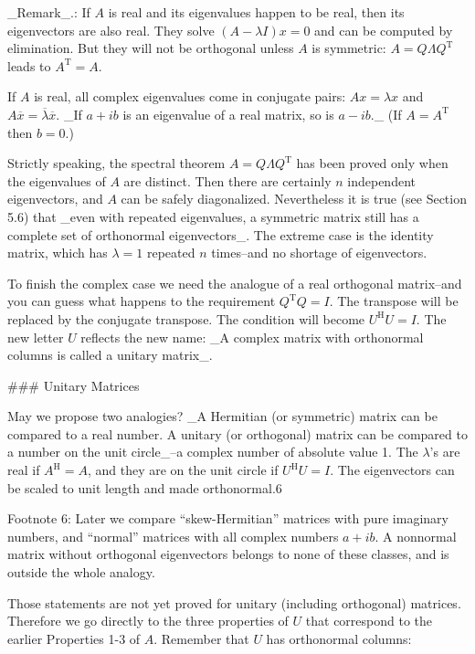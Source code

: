 _Remark_.: If \(A\) is real and its eigenvalues happen to be real, then its eigenvectors are also real. They solve \((A-\lambda I)x=0\) and can be computed by elimination. But they will not be orthogonal unless \(A\) is symmetric: \(A=Q\Lambda Q^{\mathrm{T}}\) leads to \(A^{\mathrm{T}}=A\).

If \(A\) is real, all complex eigenvalues come in conjugate pairs: \(Ax=\lambda x\) and \(A\overline{x}=\overline{\lambda}\overline{x}\). _If \(a+ib\) is an eigenvalue of a real matrix, so is \(a-ib\)._ (If \(A=A^{\mathrm{T}}\) then \(b=0\).)

Strictly speaking, the spectral theorem \(A=Q\Lambda Q^{\mathrm{T}}\) has been proved only when the eigenvalues of \(A\) are distinct. Then there are certainly \(n\) independent eigenvectors, and \(A\) can be safely diagonalized. Nevertheless it is true (see Section 5.6) that _even with repeated eigenvalues, a symmetric matrix still has a complete set of orthonormal eigenvectors_. The extreme case is the identity matrix, which has \(\lambda=1\) repeated \(n\) times--and no shortage of eigenvectors.

To finish the complex case we need the analogue of a real orthogonal matrix--and you can guess what happens to the requirement \(Q^{\mathrm{T}}Q=I\). The transpose will be replaced by the conjugate transpose. The condition will become \(U^{\mathrm{H}}U=I\). The new letter \(U\) reflects the new name: _A complex matrix with orthonormal columns is called a unitary matrix_.

### Unitary Matrices

May we propose two analogies? _A Hermitian (or symmetric) matrix can be compared to a real number. A unitary (or orthogonal) matrix can be compared to a number on the unit circle_--a complex number of absolute value 1. The \(\lambda\)'s are real if \(A^{\mathrm{H}}=A\), and they are on the unit circle if \(U^{\mathrm{H}}U=I\). The eigenvectors can be scaled to unit length and made orthonormal.6

Footnote 6: Later we compare “skew-Hermitian” matrices with pure imaginary numbers, and “normal” matrices with all complex numbers \(a+ib\). A nonnormal matrix without orthogonal eigenvectors belongs to none of these classes, and is outside the whole analogy.

Those statements are not yet proved for unitary (including orthogonal) matrices. Therefore we go directly to the three properties of \(U\) that correspond to the earlier Properties 1-3 of \(A\). Remember that \(U\) has orthonormal columns:

